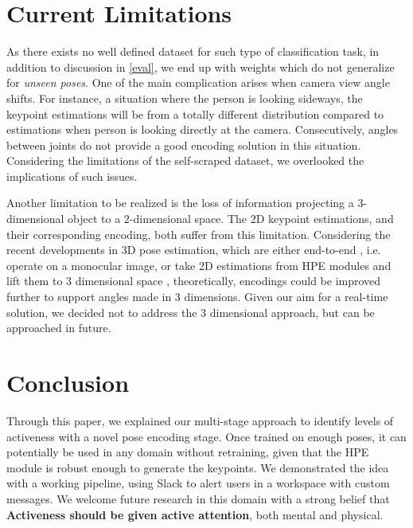 \documentclass[sigconf]{acmart}
\begin{document}
\section{Current Limitations}
As there exists no well defined dataset for such type of classification task, in addition to discussion in \autoref{eval}, we end up with weights which do not generalize for \textit{unseen poses}. One of the main complication arises when camera view angle shifts. For instance, a situation where the person is looking sideways, the keypoint estimations will be from a totally different distribution compared to estimations when person is looking directly at the camera. Consecutively, angles between joints do not provide a good encoding solution in this situation. Considering the limitations of the self-scraped dataset, we overlooked the implications of such issues.

Another limitation to be realized is the loss of information projecting a 3-dimensional object to a 2-dimensional space. The 2D keypoint estimations, and their corresponding encoding, both suffer from this limitation. Considering the recent developments in 3D pose estimation, which are either end-to-end \cite{sun2020multi}, i.e. operate on a monocular image, or take 2D estimations from HPE modules and lift them to 3 dimensional space \cite{zhaoCVPR19semantic}, theoretically, encodings could be improved further to support angles made in 3 dimensions. Given our aim for a real-time solution, we decided not to address the 3 dimensional approach, but can be approached in future.

\section{Conclusion}
Through this paper, we explained our multi-stage approach to identify levels of activeness with a novel pose encoding stage. Once trained on enough poses, it can potentially be used in any domain without retraining, given that the HPE module is robust enough to generate the keypoints. We demonstrated the idea with a working pipeline, using Slack to alert users in a workspace with custom messages. We welcome future research in this domain with a strong belief that \textbf{Activeness should be given active attention}, both mental and physical.



\end{document}
